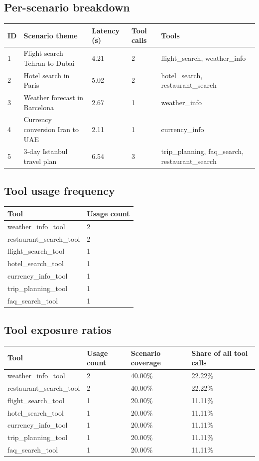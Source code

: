 \documentclass[12pt,a4paper]{article}
\begin{document}
\subsection*{Per-scenario breakdown}
\begin{longtable}{@{}p{} p{} p{} p{} p{}@{}}
\toprule
ID & Scenario theme & Latency (s) & Tool calls & Tools \\
\midrule
1 & Flight search Tehran to Dubai & 4.21 & 2 & flight\_search, weather\_info \\
2 & Hotel search in Paris & 5.02 & 2 & hotel\_search, restaurant\_search \\
3 & Weather forecast in Barcelona & 2.67 & 1 & weather\_info \\
4 & Currency conversion Iran to UAE & 2.11 & 1 & currency\_info \\
5 & 3-day Istanbul travel plan & 6.54 & 3 & trip\_planning, faq\_search, restaurant\_search \\
\bottomrule
\end{longtable}

\subsection*{Tool usage frequency}
\begin{longtable}{p{} p{}}
\toprule
Tool & Usage count \\
\midrule
weather\_info\_tool & 2 \\
restaurant\_search\_tool & 2 \\
flight\_search\_tool & 1 \\
hotel\_search\_tool & 1 \\
currency\_info\_tool & 1 \\
trip\_planning\_tool & 1 \\
faq\_search\_tool & 1 \\
\bottomrule
\end{longtable}

\subsection*{Tool exposure ratios}
\begin{longtable}{@{}p{} p{} p{} p{}@{}}
\toprule
Tool & Usage count & Scenario coverage & Share of all tool calls \\
\midrule
weather\_info\_tool & 2 & 40.00\% & 22.22\% \\
restaurant\_search\_tool & 2 & 40.00\% & 22.22\% \\
flight\_search\_tool & 1 & 20.00\% & 11.11\% \\
hotel\_search\_tool & 1 & 20.00\% & 11.11\% \\
currency\_info\_tool & 1 & 20.00\% & 11.11\% \\
trip\_planning\_tool & 1 & 20.00\% & 11.11\% \\
faq\_search\_tool & 1 & 20.00\% & 11.11\% \\
\bottomrule
\end{longtable}
\end{document}
